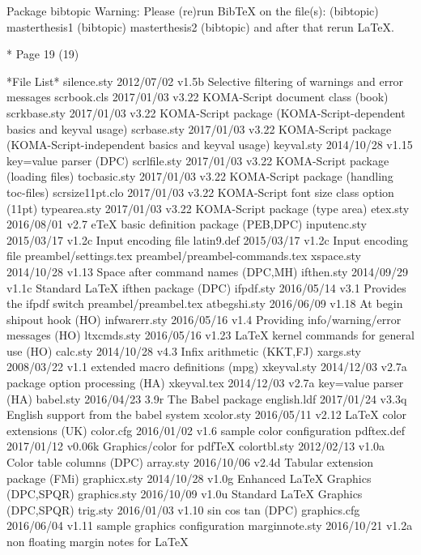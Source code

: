 
Package bibtopic Warning: Please (re)run BibTeX on the file(s):
(bibtopic)                masterthesis1
(bibtopic)                masterthesis2
(bibtopic)                and after that rerun LaTeX.

* Page 19 (19)

 *File List*
 silence.sty    2012/07/02 v1.5b Selective filtering of warnings and error messages
 scrbook.cls    2017/01/03 v3.22 KOMA-Script document class (book)
scrkbase.sty    2017/01/03 v3.22 KOMA-Script package (KOMA-Script-dependent basics and keyval usage)
 scrbase.sty    2017/01/03 v3.22 KOMA-Script package (KOMA-Script-independent basics and keyval usage)
  keyval.sty    2014/10/28 v1.15 key=value parser (DPC)
scrlfile.sty    2017/01/03 v3.22 KOMA-Script package (loading files)
tocbasic.sty    2017/01/03 v3.22 KOMA-Script package (handling toc-files)
scrsize11pt.clo    2017/01/03 v3.22 KOMA-Script font size class option (11pt)
typearea.sty    2017/01/03 v3.22 KOMA-Script package (type area)
    etex.sty    2016/08/01 v2.7 eTeX basic definition package (PEB,DPC)
inputenc.sty    2015/03/17 v1.2c Input encoding file
  latin9.def    2015/03/17 v1.2c Input encoding file
preambel/settings.tex
preambel/preambel-commands.tex
  xspace.sty    2014/10/28 v1.13 Space after command names (DPC,MH)
  ifthen.sty    2014/09/29 v1.1c Standard LaTeX ifthen package (DPC)
   ifpdf.sty    2016/05/14 v3.1 Provides the ifpdf switch
preambel/preambel.tex
atbegshi.sty    2016/06/09 v1.18 At begin shipout hook (HO)
infwarerr.sty    2016/05/16 v1.4 Providing info/warning/error messages (HO)
 ltxcmds.sty    2016/05/16 v1.23 LaTeX kernel commands for general use (HO)
    calc.sty    2014/10/28 v4.3 Infix arithmetic (KKT,FJ)
   xargs.sty    2008/03/22 v1.1  extended macro definitions  (mpg)
 xkeyval.sty    2014/12/03 v2.7a package option processing (HA)
 xkeyval.tex    2014/12/03 v2.7a key=value parser (HA)
   babel.sty    2016/04/23 3.9r The Babel package
 english.ldf    2017/01/24 v3.3q English support from the babel system
  xcolor.sty    2016/05/11 v2.12 LaTeX color extensions (UK)
   color.cfg    2016/01/02 v1.6 sample color configuration
  pdftex.def    2017/01/12 v0.06k Graphics/color for pdfTeX
colortbl.sty    2012/02/13 v1.0a Color table columns (DPC)
   array.sty    2016/10/06 v2.4d Tabular extension package (FMi)
graphicx.sty    2014/10/28 v1.0g Enhanced LaTeX Graphics (DPC,SPQR)
graphics.sty    2016/10/09 v1.0u Standard LaTeX Graphics (DPC,SPQR)
    trig.sty    2016/01/03 v1.10 sin cos tan (DPC)
graphics.cfg    2016/06/04 v1.11 sample graphics configuration
marginnote.sty    2016/10/21 v1.2a non floating margin notes for LaTeX
